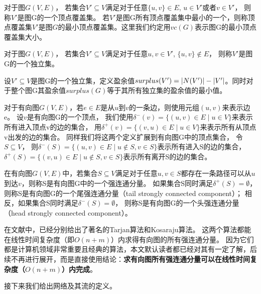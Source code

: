 \begin{definition}[顶点覆盖集]
对于图$G(V, E)$， 若集合$V' \subseteq V$满足对于任意$\{u, v\} \in E$, $u \in V'$或者$v \in V'$， 则称$V'$是图G的一个顶点覆盖集。
若$V'$是图G所有顶点覆盖集中最小的一个，则称顶点覆盖集$V'$是图$G$的最小顶点覆盖集。这里我们约定用$vc(G)$表示图G的最小顶点覆盖集大小。
\end{definition}

\begin{definition}[独立集]
对于图$G(V, E)$， 若集合$V' \subseteq V$满足对于任意$u, v \in V'$, $\{u, v\} \notin E$， 则称$V'$是图G的一个独立集。
\end{definition}

设$V' \subseteq V$是图G的一个独立集，定义盈余值$surplus(V') = \left\vert N(V') \right\vert - \left\vert V' \right\vert$。同时对于整个图G其盈余值$surplus(G)$等于其所有独立集的盈余值的最小值。

对于有向图$G(V, E)$，若$e \in E$是从$u$到$v$的一条边，则使用元组$(u, v)$来表示边e。
设$v$是有向图G的一个顶点， 我们使用$\delta^-(v)=\{(u, v) \in E\;|\;u \in V\}$来表示所有进入顶点v的边的集合，
用$\delta^+(v)=\{(v, u) \in E\;|\;u \in V\}$来表示所有从顶点v出发的边的集合。
同样我们将这两个定义扩展到有向图G中的顶点集合， 令$S \subseteq V$，
则$\delta^-(S)=\{(u, v) \in E\;|\;u \notin S, v \in S\}$表示所有进入S的边的集合，
$\delta^+(S)=\{(v, u) \in E\;|\; u \notin S, v \in S\}$表示所有离开S的边的集合。

\begin{definition}
在有向图$G(V, E)$中，若集合$S \subseteq V$满足对于任意$u, v \in S$都存在一条路径可以从$u$到达$v$，则称S是有向图G中的一个强连通分量。
如果集合S同时满足$\delta^+(S) = \emptyset$， 则称S是有向图G的一个尾强连通分量（tail strongly connected component）；
相反，如果集合S同时满足$\delta^-(S) = \emptyset$， 则称S是有向图G的一个头强连通分量（head strongly connected component）。
\end{definition}

在文献\cite{tarjan1972depth,sharir1981strong}中，已经分别给出了著名的Tarjan算法和Kosaraju算法。
这两个算法都能在线性时间复杂度（即$O(n + m)$）内求得有向图的所有强连通分量。
因为它们都是计算机领域非常重要且经典的算法，本文默认读者都已经对其有一定了解，后续不再进行展开，而是直接使用结论：\textbf{求有向图所有强连通分量可以在线性时间复杂度（$O(n + m)$）内完成}。

接下来我们给出网络及其流的定义。

